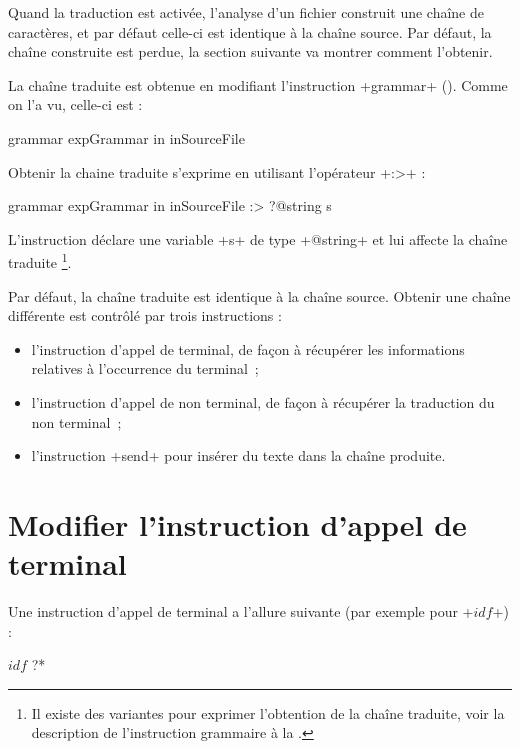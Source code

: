 Quand la traduction est activée, l'analyse d'un fichier construit une chaîne de caractères, et par défaut celle-ci est identique à la chaîne source. Par défaut, la chaîne construite est perdue, la section suivante va montrer comment l'obtenir.









La chaîne traduite est obtenue en modifiant l'instruction \ggsq+grammar+ (). Comme on l'a vu, celle-ci est :
\begin{galgas4}
grammar expGrammar in inSourceFile
\end{galgas4}

Obtenir la chaine traduite s'exprime en utilisant l'opérateur  \ggsq+:>+ :
\begin{galgas4}
grammar expGrammar in inSourceFile :> ?@string s
\end{galgas4}

L'instruction déclare une variable \ggsq+s+ de type \ggsq+@string+ et lui affecte la chaîne traduite \footnote{Il existe des variantes pour exprimer l'obtention de la chaîne traduite, voir la description de l'instruction grammaire à la .}.

Par défaut, la chaîne traduite est identique à la chaîne source. Obtenir une chaîne différente est contrôlé par trois instructions :
\begin{itemize}
  \item l'instruction d'appel de terminal, de façon à récupérer les informations relatives à l'occurrence du terminal~;
  \item l'instruction d'appel de non terminal, de façon à récupérer la traduction du non terminal~;
  \item l'instruction \ggsq+send+ pour insérer du texte dans la chaîne produite.
\end{itemize}







\section{Modifier l'instruction d'appel de terminal}

Une instruction d'appel de terminal a l'allure suivante (par exemple pour \ggsq+$idf$+) :
\begin{galgas4}
$idf$ ?*
\end{galgas4}

